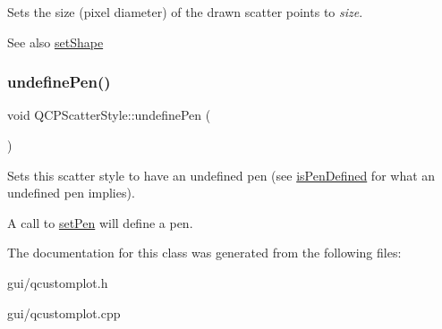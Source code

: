 Sets the size (pixel diameter) of the drawn scatter points to {\itshape size}.

\begin{DoxySeeAlso}{See also}
\hyperlink{classQCPScatterStyle_a7c641c4d4c6d29cb705d3887cfce91c1}{set\+Shape} 
\end{DoxySeeAlso}
\mbox{\label{classQCPScatterStyle_acabc2a8c83d650b946f50c3166b6c35e}} 
\subsubsection{\texorpdfstring{undefine\+Pen()}{undefinePen()}}
{\footnotesize\ttfamily void Q\+C\+P\+Scatter\+Style\+::undefine\+Pen (\begin{DoxyParamCaption}{ }\end{DoxyParamCaption})}

Sets this scatter style to have an undefined pen (see \hyperlink{classQCPScatterStyle_a47077eb6450fe9a788f833e4ec1b1d5a}{is\+Pen\+Defined} for what an undefined pen implies).

A call to \hyperlink{classQCPScatterStyle_a761f1f229cc0ca4703e1e2b89f6dd1ba}{set\+Pen} will define a pen. 

The documentation for this class was generated from the following files\+:\begin{DoxyCompactItemize}
\item 
gui/qcustomplot.\+h\item 
gui/qcustomplot.\+cpp\end{DoxyCompactItemize}
